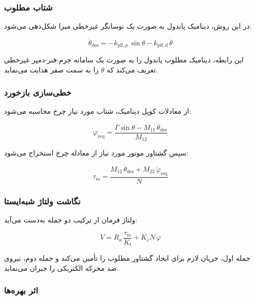 \subsubsection{شتاب مطلوب}

در این روش، دینامیک پاندول به صورت یک نوسانگر غیرخطی میرا شکل‌دهی می‌شود:

\begin{equation}
\ddot\theta_{\text{des}} = -k_{\text{pfl},p}\,\sin\theta - k_{\text{pfl},d}\,\dot\theta
\label{eq:pfl-desired}
\end{equation}

این رابطه، دینامیک مطلوب پاندول را به صورت یک سامانه جرم-فنر-دمپر غیرخطی تعریف می‌کند که $\theta$ را به سمت صفر هدایت می‌نماید.

\subsubsection{خطی‌سازی بازخورد}

از معادلات کوپل دینامیک، شتاب مورد نیاز چرخ محاسبه می‌شود:

\begin{equation}
\ddot\varphi_{\text{req}} = \frac{\Gamma\sin\theta - M_{11}\,\ddot\theta_{\text{des}}}{M_{12}}
\end{equation}

سپس گشتاور موتور مورد نیاز از معادله چرخ استخراج می‌شود:

\begin{equation}
\tau_m = \frac{M_{12}\,\ddot\theta_{\text{des}} + M_{22}\,\ddot\varphi_{\text{req}}}{N}
\end{equation}

\subsubsection{نگاشت ولتاژ شبه‌ایستا}

ولتاژ فرمان از ترکیب دو جمله به‌دست می‌آید:

\begin{equation}
V = R_a\,\frac{\tau_m}{K_t} + K_e N\,\dot\varphi
\label{eq:pfl-voltage}
\end{equation}

جمله اول، جریان لازم برای ایجاد گشتاور مطلوب را تأمین می‌کند و جمله دوم، نیروی ضد محرکه الکتریکی را جبران می‌نماید.

\subsubsection{اثر بهره‌ها}

